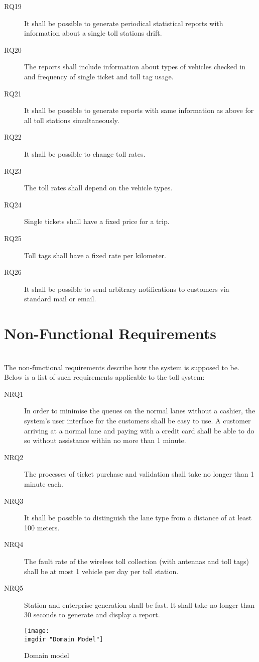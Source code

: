 \begin{description}
  \item[RQ19] It shall be possible to generate periodical statistical reports with information about a single toll stations drift.
  \item[RQ20] The reports shall include information about types of vehicles checked in and frequency of single ticket and toll tag usage.
  \item[RQ21] It shall be possible to generate reports with same information as above for all toll stations simultaneously.

  \item[RQ22] It shall be possible to change toll rates.
  \item[RQ23] The toll rates shall depend on the vehicle types.
  \item[RQ24] Single tickets shall have a fixed price for a trip.
  \item[RQ25] Toll tags shall have a fixed rate per kilometer.
  \item[RQ26] It shall be possible to send arbitrary notifications to customers via standard mail or email.

\end{description}
\section{Non-Functional Requirements} \trevon \pawel \\
The non-functional requirements describe how the system is supposed to be. Below is a list of such requirements applicable to the toll system:

\begin{description}
  \item[NRQ1] In order to minimise the queues on the normal lanes without a cashier, the system's user interface for the customers shall be easy to use. A customer arriving at a normal lane and paying with a credit card shall be able to do so without assistance within no more than 1 minute. 
  \item[NRQ2] The processes of ticket purchase and validation shall take no longer than 1 minute each.
  \item[NRQ3] It shall be possible to distinguish the lane type from a distance of at least 100 meters.
  \item[NRQ4] The fault rate of the wireless toll collection (with antennas and toll tags) shall be at most 1 vehicle per day per toll station.
  \item[NRQ5] Station and enterprise generation shall be fast. It shall take no longer than 30 seconds to generate and display a report.
\end{description}


\begin{figure}
\texttt{[image: \\imgdir "Domain Model"]}
\caption{Domain model}
\label{fig:domain_model}
\end{figure}
